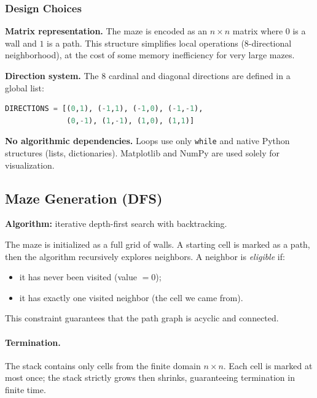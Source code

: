 \documentclass[12pt, a4paper]{article}
\theoremstyle{definition}
\newcommand{\code}[1]{\texttt{#1}}
\begin{document}
\subsubsection*{Design Choices}

\textbf{Matrix representation.}
The maze is encoded as an $n \times n$ matrix where $0$ is a wall and $1$ is a path.
This structure simplifies local operations (8-directional neighborhood), at the cost
of some memory inefficiency for very large mazes.

\textbf{Direction system.}
The 8 cardinal and diagonal directions are defined in a global list:

\begin{lstlisting}[language=Python]
DIRECTIONS = [(0,1), (-1,1), (-1,0), (-1,-1),
              (0,-1), (1,-1), (1,0), (1,1)]
\end{lstlisting}

\textbf{No algorithmic dependencies.}
Loops use only \code{while} and native Python structures (lists, dictionaries).
Matplotlib and NumPy are used solely for visualization.

\subsection{Maze Generation (DFS)}

\textbf{Algorithm:} iterative depth-first search with backtracking.

The maze is initialized as a full grid of walls. A starting cell is marked as a path,
then the algorithm recursively explores neighbors. A neighbor is \emph{eligible} if:

\begin{itemize}
    \item it has never been visited (value $= 0$);
    \item it has exactly one visited neighbor (the cell we came from).
\end{itemize}

This constraint guarantees that the path graph is acyclic and connected.

\paragraph{Termination.}
The stack contains only cells from the finite domain $n \times n$.
Each cell is marked at most once; the stack strictly grows then shrinks,
guaranteeing termination in finite time.
\end{document}
